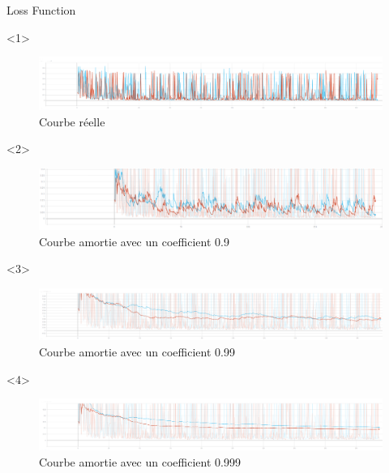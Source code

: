 \documentclass{beamer}
\begin{document}
\begin{frame}[t]{Loss Function}
  \begin{onlyenv}<1>
    \begin{figure}
      \includegraphics[scale=0.2]{annex/loss_not_smoothed}
      \caption{Courbe réelle}
      \label{courbe}
    \end{figure}
  \end{onlyenv}
  \begin{onlyenv}<2>
    \begin{figure}
      \includegraphics[scale=0.24]{annex/loss_smoothed_09}
      \caption{Courbe amortie avec un coefficient 0.9}
      \label{courbe}
    \end{figure}
  \end{onlyenv}
  \begin{onlyenv}<3>
    \begin{figure}
      \includegraphics[scale=0.2]{annex/loss_smoothed_099}
      \caption{Courbe amortie avec un coefficient 0.99}
      \label{courbe99}
    \end{figure}
  \end{onlyenv}
  \begin{onlyenv}<4>
    \begin{figure}
      \includegraphics[scale=0.2]{annex/loss_smoothed_0999}
      \caption{Courbe amortie avec un coefficient 0.999}
      \label{courbe999}
    \end{figure}
  \end{onlyenv}
\end{frame}
\end{document}

